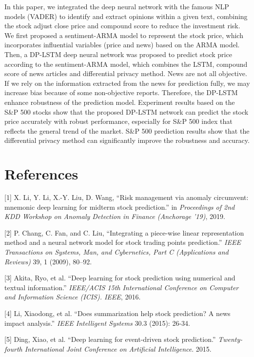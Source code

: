 \documentclass{article}
\begin{document}
In this paper, we integrated the deep neural network with the famous NLP models (VADER) to identify and extract opinions within a given text, combining the stock adjust close price and compound score to reduce the investment risk. We first proposed a sentiment-ARMA model to represent the stock price, which incorporates influential variables (price and news) based on the ARMA model. Then, a DP-LSTM deep neural network was proposed to predict stock price according to the sentiment-ARMA model, which combines the LSTM, compound score of news articles and differential privacy method. News are not all objective. If we rely on the information extracted from the news for prediction fully, we may increase bias because of some non-objective reports. Therefore, the DP-LSTM enhance robustness of the prediction model. Experiment results based on the S\&P 500 stocks show that the proposed DP-LSTM network can predict the stock price accurately with robust performance, especially for S\&P 500 index that reflects the general trend of the market. S\&P 500 prediction results show that the differential privacy method can significantly improve the robustness and accuracy.





\section*{References}


\small

[1] X. Li, Y. Li, X.-Y. Liu, D. Wang, ``Risk management via anomaly circumvent: mnemonic deep learning for midterm stock prediction.'' in {\em Proceedings of 2nd KDD Workshop on Anomaly Detection in Finance (Anchorage ’19)}, 2019.

[2] P. Chang, C. Fan, and C. Liu, ``Integrating a piece-wise linear representation method and a neural network model for stock trading points prediction.'' {\em IEEE Transactions on Systems, Man, and Cybernetics, Part C (Applications and Reviews)} 39, 1 (2009), 80–92.


[3] Akita, Ryo, et al. ``Deep learning for stock prediction using numerical and textual information.'' {\em IEEE/ACIS 15th International Conference on Computer and Information Science (ICIS). IEEE}, 2016.


[4] Li, Xiaodong, et al. ``Does summarization help stock prediction? A news impact analysis.'' {\em IEEE Intelligent Systems} 30.3 (2015): 26-34.


[5] Ding, Xiao, et al. ``Deep learning for event-driven stock prediction.'' {\em Twenty-fourth International Joint Conference on Artificial Intelligence}. 2015.
\end{document}
